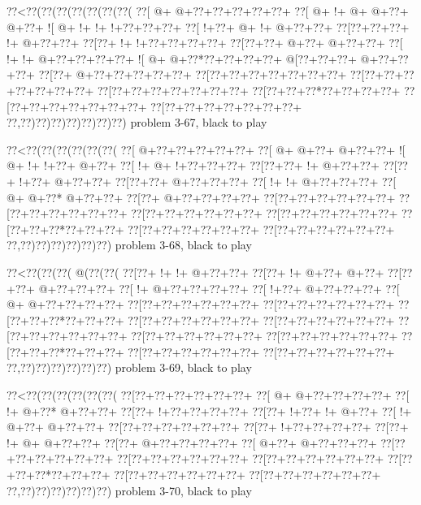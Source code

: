 \vbox{\vbox{\goo
\0??<\0??(\0??(\0??(\0??(\0??(\0??(\0??(
\0??[\- @+\- @+\0??+\0??+\0??+\0??+\0??+
\0??[\- @+\- !+\- @+\- @+\0??+\- @+\0??+
\- ![\- @+\- !+\- !+\- !+\0??+\0??+\0??+
\0??[\- !+\0??+\- @+\- !+\- @+\0??+\0??+
\0??[\0??+\0??+\0??+\- !+\- @+\0??+\0??+
\0??[\0??+\- !+\- !+\0??+\0??+\0??+\0??+
\0??[\0??+\0??+\- @+\0??+\- @+\0??+\0??+
\0??[\- !+\- !+\- @+\0??+\0??+\0??+\0??+
\- ![\- @+\- @+\0??*\0??+\0??+\0??+\0??+
\- @[\0??+\0??+\0??+\- @+\0??+\0??+\0??+
\0??[\0??+\- @+\0??+\0??+\0??+\0??+\0??+
\0??[\0??+\0??+\0??+\0??+\0??+\0??+\0??+
\0??[\0??+\0??+\0??+\0??+\0??+\0??+\0??+
\0??[\0??+\0??+\0??+\0??+\0??+\0??+\0??+
\0??[\0??+\0??+\0??*\0??+\0??+\0??+\0??+
\0??[\0??+\0??+\0??+\0??+\0??+\0??+\0??+
\0??[\0??+\0??+\0??+\0??+\0??+\0??+\0??+
\0??,\0??)\0??)\0??)\0??)\0??)\0??)\0??)
}
\hfil problem 3-67, black to play\hfil\break
}

\vbox{\vbox{\goo
\0??<\0??(\0??(\0??(\0??(\0??(\0??(
\0??[\- @+\0??+\0??+\0??+\0??+\0??+
\0??[\- @+\- @+\0??+\- @+\0??+\0??+
\- ![\- @+\- !+\- !+\0??+\- @+\0??+
\0??[\- !+\- @+\- !+\0??+\0??+\0??+
\0??[\0??+\0??+\- !+\- @+\0??+\0??+
\0??[\0??+\- !+\0??+\- @+\0??+\0??+
\0??[\0??+\0??+\- @+\0??+\0??+\0??+
\0??[\- !+\- !+\- @+\0??+\0??+\0??+
\0??[\- @+\- @+\0??*\- @+\0??+\0??+
\0??[\0??+\- @+\0??+\0??+\0??+\0??+
\0??[\0??+\0??+\0??+\0??+\0??+\0??+
\0??[\0??+\0??+\0??+\0??+\0??+\0??+
\0??[\0??+\0??+\0??+\0??+\0??+\0??+
\0??[\0??+\0??+\0??+\0??+\0??+\0??+
\0??[\0??+\0??+\0??*\0??+\0??+\0??+
\0??[\0??+\0??+\0??+\0??+\0??+\0??+
\0??[\0??+\0??+\0??+\0??+\0??+\0??+
\0??,\0??)\0??)\0??)\0??)\0??)\0??)
}
\hfil problem 3-68, black to play\hfil\break
}

\vbox{\vbox{\goo
\0??<\0??(\0??(\0??(\- @(\0??(\0??(
\0??[\0??+\- !+\- !+\- @+\0??+\0??+
\0??[\0??+\- !+\- @+\0??+\- @+\0??+
\0??[\0??+\0??+\- @+\0??+\0??+\0??+
\0??[\- !+\- @+\0??+\0??+\0??+\0??+
\0??[\- !+\0??+\- @+\0??+\0??+\0??+
\0??[\- @+\- @+\0??+\0??+\0??+\0??+
\0??[\0??+\0??+\0??+\0??+\0??+\0??+
\0??[\0??+\0??+\0??+\0??+\0??+\0??+
\0??[\0??+\0??+\0??*\0??+\0??+\0??+
\0??[\0??+\0??+\0??+\0??+\0??+\0??+
\0??[\0??+\0??+\0??+\0??+\0??+\0??+
\0??[\0??+\0??+\0??+\0??+\0??+\0??+
\0??[\0??+\0??+\0??+\0??+\0??+\0??+
\0??[\0??+\0??+\0??+\0??+\0??+\0??+
\0??[\0??+\0??+\0??*\0??+\0??+\0??+
\0??[\0??+\0??+\0??+\0??+\0??+\0??+
\0??[\0??+\0??+\0??+\0??+\0??+\0??+
\0??,\0??)\0??)\0??)\0??)\0??)\0??)
}
\hfil problem 3-69, black to play\hfil\break
}

\vbox{\vbox{\goo
\0??<\0??(\0??(\0??(\0??(\0??(\0??(
\0??[\0??+\0??+\0??+\0??+\0??+\0??+
\0??[\- @+\- @+\0??+\0??+\0??+\0??+
\0??[\- !+\- @+\0??*\- @+\0??+\0??+
\0??[\0??+\- !+\0??+\0??+\0??+\0??+
\0??[\0??+\- !+\0??+\- !+\- @+\0??+
\0??[\- !+\- @+\0??+\- @+\0??+\0??+
\0??[\0??+\0??+\0??+\0??+\0??+\0??+
\0??[\0??+\- !+\0??+\0??+\0??+\0??+
\0??[\0??+\- !+\- @+\- @+\0??+\0??+
\0??[\0??+\- @+\0??+\0??+\0??+\0??+
\0??[\- @+\0??+\- @+\0??+\0??+\0??+
\0??[\0??+\0??+\0??+\0??+\0??+\0??+
\0??[\0??+\0??+\0??+\0??+\0??+\0??+
\0??[\0??+\0??+\0??+\0??+\0??+\0??+
\0??[\0??+\0??+\0??*\0??+\0??+\0??+
\0??[\0??+\0??+\0??+\0??+\0??+\0??+
\0??[\0??+\0??+\0??+\0??+\0??+\0??+
\0??,\0??)\0??)\0??)\0??)\0??)\0??)
}
\hfil problem 3-70, black to play\hfil\break
}

